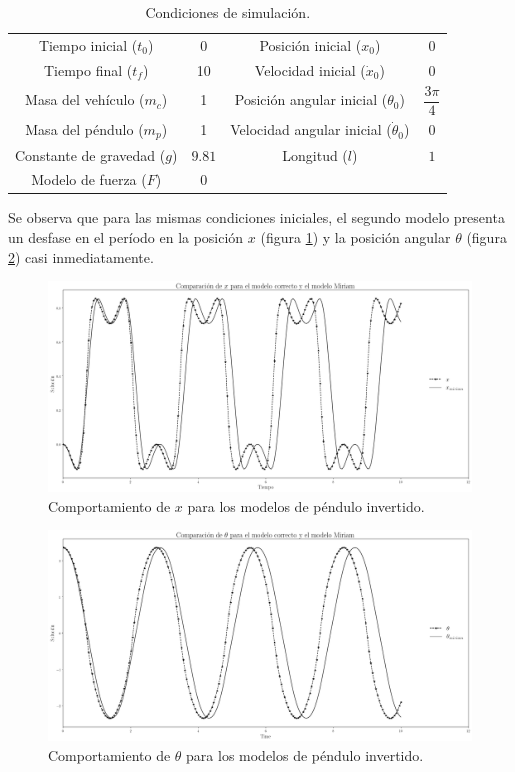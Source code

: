 \documentclass[12pt,letterpaper]{article}
\begin{document}
\begin{table}[h]
\begin{center}
\centering
\begin{tabular}{cccc}
\hline
Tiempo inicial ($t_0$) & 0  & Posición inicial ($x_0$) & $0$ \\
Tiempo final ($t_f$) & 10 & Velocidad inicial ($\dot{x}_0$)& $0$\\
Masa del vehículo ($m_c$) & 1 &  Posición angular inicial ($\theta_0$) & $\dfrac{3 \pi}{4}$\\
Masa del péndulo ($m_p$) & 1 & Velocidad angular inicial ($\dot{\theta}_0$)& $0$\\
Constante de gravedad ($g$) & $9.81$ & Longitud ($l$) & $1$ \\
Modelo de fuerza ($F$) & $0$ & & \\
\hline
\end{tabular}
\end{center}
 \caption{Condiciones de simulación.}
 \label{table: ip initial conditions}
\end{table}

Se observa que para las mismas condiciones iniciales, el segundo modelo presenta un desfase en el período en la posición $x$ (figura \ref{fig: ip x}) y la posición angular $\theta$ (figura \ref{fig: ip theta}) casi inmediatamente.

\begin{figure}[h]
 \centering
 \includegraphics[scale=0.2]{img/ip_x.png}
 \caption{Comportamiento de $x$ para los modelos de péndulo invertido.}
 \label{fig: ip x}
\end{figure}

\begin{figure}[h]
 \centering
 \includegraphics[scale=0.2]{img/ip_theta.png}
 \caption{Comportamiento de $\theta$ para los modelos de péndulo invertido.}
 \label{fig: ip theta}
\end{figure}
\end{document}
